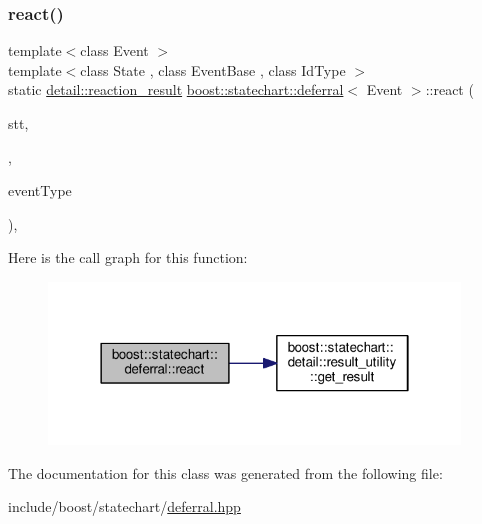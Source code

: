\subsubsection{\texorpdfstring{react()}{react()}}
{\footnotesize\ttfamily template$<$class Event $>$ \\
template$<$class State , class Event\+Base , class Id\+Type $>$ \\
static \mbox{\hyperlink{namespaceboost_1_1statechart_1_1detail_ab091bbb4c29327fb46ee479ea1b7255b}{detail\+::reaction\+\_\+result}} \mbox{\hyperlink{classboost_1_1statechart_1_1deferral}{boost\+::statechart\+::deferral}}$<$ Event $>$\+::react (\begin{DoxyParamCaption}\item[{State \&}]{stt,  }\item[{const Event\+Base \&}]{,  }\item[{const Id\+Type \&}]{event\+Type }\end{DoxyParamCaption})\hspace{0.3cm}{\ttfamily [inline]}, {\ttfamily [static]}}

Here is the call graph for this function\+:
\nopagebreak
\begin{figure}[H]
\begin{center}
\leavevmode
\includegraphics[width=310pt]{classboost_1_1statechart_1_1deferral_ab484b1838dac52a4f49a6ce61ef5f0cc_cgraph}
\end{center}
\end{figure}


The documentation for this class was generated from the following file\+:\begin{DoxyCompactItemize}
\item 
include/boost/statechart/\mbox{\hyperlink{deferral_8hpp}{deferral.\+hpp}}\end{DoxyCompactItemize}

